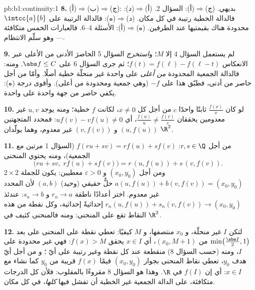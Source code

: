 \begin{solution}{pb:b1:continuity:1}
\textbf{8.} (أ)$\Rightarrow$(ب)$\Rightarrow$(ج): بديهي.
(ج)$\Rightarrow$(أ): السؤال 2. (أ)$\Rightarrow$(د): فالدالة الخطية
رتيبة في كل مكان. (د)$\Rightarrow$(ه): فالدالة الرتيبة
على $\intcc{a}{b}$ محدودة هناك بقيمتيها عند
الطرفين. (ه)$\Rightarrow$(أ): الأسئلة 4--6. فالعبارات
الخمس متكافئة --- وهو سلّم الانتظام.

\textbf{9.} لم يستعمل السؤال 4 إلا  $M$؛ و\emph{استخرج}
السؤال 5 الحاصرَ الأدنى من الأعلى عبر
الانعكاس $f(t) = f(\ell) - f(\ell - t)$؛ ثم جرى السؤال 6 على
$\abs f \leq C$. ومنه: فالدالة الجمعية المحدودة \emph{من أعلى} على 
واحدة غير منحلّة خطية أصلًا. وأمّا من أجل حاصر
من أدنى، فطبّق هذا على $-f$ (وهي جمعية ومحدودة من أعلى). وأقوى
درجة (ه): يكفي حاصر من جهة واحدة على  واحدة.

\textbf{10.} لو كان $\frac{f(x)}{x}$ ثابتًا واحدًا $c$ من أجل كل
$x \neq 0$، لكانت $f$ خطية؛ ومنه يوجد $u, v$ غير معدومين
يحققان $\frac{f(u)}u \neq \frac{f(v)}v$، أي $u f(v) - v f(u)
\neq 0$: فمحدد المتجهتين $(u, f(u))$ و $(v,
f(v))$ غير معدوم، وهما يولّدان $\R^2$.

\textbf{11.} من أجل $r, s \in \Q$: $f(ru + sv) = r f(u) + s f(v)$
(السؤال 1 مرتين مع الجمعية)، ومنه يحتوي المنحنى
\[
\bigl(ru + sv,\; r f(u) + s f(v)\bigr)
= r\,(u, f(u)) + s\,(v, f(v)) .
\]
ومن أجل $(x_0, y_0)$ و $\varepsilon > 0$ معطيين: يكون للجملة
$2 \times 2$ $a(u, f(u)) + b(v, f(v)) = (x_0, y_0)$ حلٌّ حقيقي
(وحيد) $(a, b)$ لأن المحدد غير معدوم. اختر
أعدادًا ناطقة $r_n \to a$ و $s_n \to b$: عندئذ $r_n(u, f(u)) +
s_n(v, f(v)) \to (x_0, y_0)$ إحداثيةً إحداثية، وكل نقطة من هذه
النقاط تقع على المنحنى: ومنه فالمنحنى كثيف في $\R^2$.

\textbf{12.} لتكن $I$  غير منحلّة، و $x_0$
منتصفها، و $M$ كيفيًا: تعطي  نقطة على المنحنى على بعد
$\min\bigl(\frac{\abs I}{2}, 1\bigr)$ من $(x_0, M + 1)$، أي
$x \in I$ يحقق $f(x) > M$: فهي غير محدودة على $I$، ومنه (حسب السؤال 8)
منقطعة عند كل نقطة وغير رتيبة على أيّ ؛ و
من أجل أيّ هدف $y_0$، تعطي نقاط المنحنى بجوار $(x_0, y_0)$ قيمًا $f(x)$
قريبة من $y_0$ كما نشاء مع $x \in I$: أي إن $f(I)$  في
$\R$. وهذا هو السؤال 8 مقروءًا بالمقلوب: فلأن كل الدرجات
متكافئة، على الدالة الجمعية غير الخطية أن تفشل فيها
\emph{كلها}، في كل مكان.


\end{solution}

